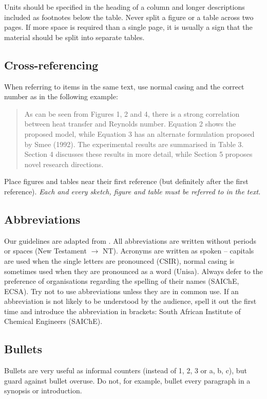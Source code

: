 \documentclass[a5paper, 10pt]{article}
\begin{document}
Units should be specified in the heading of a column and longer descriptions included as footnotes below the table.
Never split a figure or a table across two pages.
If more space is required than a single page, it is usually a sign that the material should be split into separate tables.

\subsection{Cross-referencing}
When referring to items in the same text, use normal casing and the
correct number as in the following example:

\begin{quote}
  As can be seen from Figures 1, 2 and 4, there is a strong
  correlation between heat transfer and Reynolds number.  Equation 2
  shows the proposed model, while Equation 3 has an alternate
  formulation proposed by Smee (1992).  The experimental results are
  summarised in Table 3.  Section 4 discusses these results in more
  detail, while Section 5 proposes novel research directions.
\end{quote}

Place figures and tables near their first reference (but definitely
after the first reference).  \emph{Each and every sketch, figure and
  table must be referred to in the text.}

\subsection{Abbreviations}
\label{sec:abbreviations}
Our guidelines are adapted from \citet[17]{burger}.  All abbreviations
are written without periods or spaces (New Testament $\rightarrow$
NT).  Acronyms are written as spoken -- capitals are used when the
single letters are pronounced (CSIR), normal casing is sometimes used
when they are pronounced as a word (Unisa).  Always defer to the
preference of organisations regarding the spelling of their names
(SAIChE, ECSA).  Try not to use abbreviations unless they are in
common use.  If an abbreviation is not likely to be understood by the
audience, spell it out the first time and introduce the abbreviation
in brackets: South African Institute of Chemical Engineers (SAIChE).

\subsection{Bullets}
\label{sec:bullets}
Bullets are very useful as informal counters (instead of 1, 2, 3 or a, b, c), but guard against bullet overuse.
Do not, for example, bullet every paragraph in a synopsis or introduction.
\end{document}
